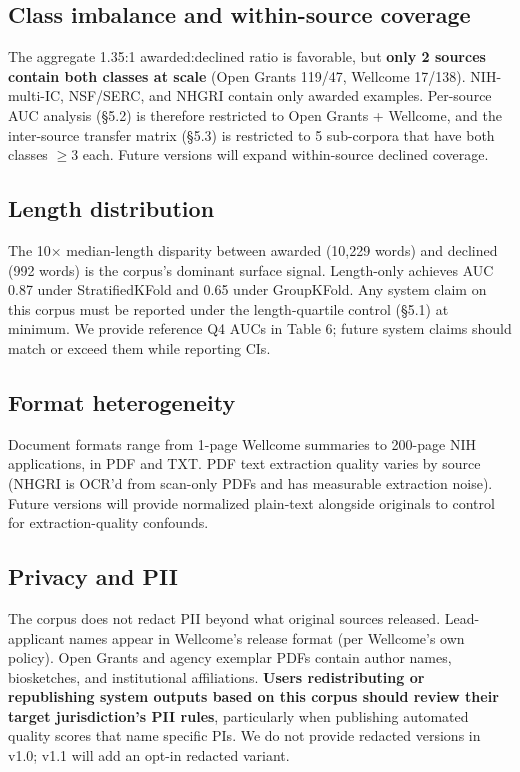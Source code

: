 \documentclass[11pt]{article}
\begin{document}
\subsection{Class imbalance and within-source coverage}

The aggregate 1.35:1 awarded:declined ratio is favorable, but \textbf{only 2 sources contain both classes at scale} (Open Grants 119/47, Wellcome 17/138). NIH-multi-IC, NSF/SERC, and NHGRI contain only awarded examples. Per-source AUC analysis (§5.2) is therefore restricted to Open Grants + Wellcome, and the inter-source transfer matrix (§5.3) is restricted to 5 sub-corpora that have both classes $\geq$3 each. Future versions will expand within-source declined coverage.

\subsection{Length distribution}

The 10$\times$ median-length disparity between awarded (10,229 words) and declined (992 words) is the corpus's dominant surface signal. Length-only achieves AUC 0.87 under StratifiedKFold and 0.65 under GroupKFold. Any system claim on this corpus must be reported under the length-quartile control (§5.1) at minimum. We provide reference Q4 AUCs in Table 6; future system claims should match or exceed them while reporting CIs.

\subsection{Format heterogeneity}

Document formats range from 1-page Wellcome summaries to 200-page NIH applications, in PDF and TXT. PDF text extraction quality varies by source (NHGRI is OCR'd from scan-only PDFs and has measurable extraction noise). Future versions will provide normalized plain-text alongside originals to control for extraction-quality confounds.

\subsection{Privacy and PII}

The corpus does not redact PII beyond what original sources released. Lead-applicant names appear in Wellcome's release format (per Wellcome's own policy). Open Grants and agency exemplar PDFs contain author names, biosketches, and institutional affiliations. \textbf{Users redistributing or republishing system outputs based on this corpus should review their target jurisdiction's PII rules}, particularly when publishing automated quality scores that name specific PIs. We do not provide redacted versions in v1.0; v1.1 will add an opt-in redacted variant.
\end{document}
